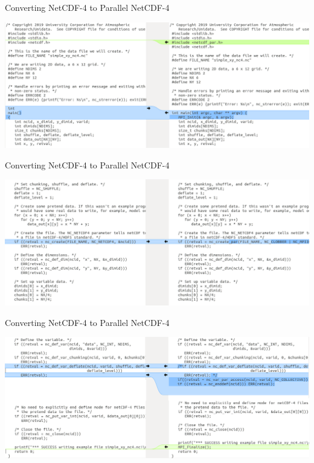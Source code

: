 \documentclass[compress,11pt,xcolor=svgnames,aspectratio=169]{beamer}
\begin{document}
\begin{frame}[fragile]{Converting NetCDF-4 to Parallel NetCDF-4}

\begin{center}
\includegraphics[scale=0.42]{fig/netcdf-par1}
\end{center}

\end{frame}

\begin{frame}[fragile]{Converting NetCDF-4 to Parallel NetCDF-4}

\begin{center}
\includegraphics[scale=0.42]{fig/netcdf-par2}
\end{center}

\end{frame}

\begin{frame}[fragile]{Converting NetCDF-4 to Parallel NetCDF-4}

\begin{center}
\includegraphics[scale=0.42]{fig/netcdf-par3}
\end{center}

\end{frame}
\end{document}
